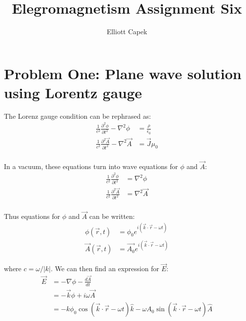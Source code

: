 \documentclass[10pt]{article} %
\title{Elegromagnetism Assignment Six}
\author{Elliott Capek}
\begin{document}
\maketitle{}

\section{Problem One: Plane wave solution using Lorentz gauge}
The Lorenz gauge condition can be rephrased as:\\

\begin{align*}
  \frac{1}{c^2}\frac{\partial^2\phi}{\partial t^2} - \nabla^2 \phi &= \frac{\rho}{\epsilon_0}\\
  \frac{1}{c^2}\frac{\partial^2\vec{A}}{\partial t^2} - \nabla^2 \vec{A} &= \vec{J}\mu_0\\
\end{align*}

In a vacuum, these equations turn into wave equations for $\phi$ and $\vec{A}$:\\

\begin{align*}
  \frac{1}{c^2}\frac{\partial^2\phi}{\partial t^2} &= \nabla^2 \phi\\
  \frac{1}{c^2}\frac{\partial^2\vec{A}}{\partial t^2} &= \nabla^2 \vec{A}\\
\end{align*}

Thus equations for $\phi$ and $\vec{A}$ can be written:\\

\begin{align*}
  \phi(\vec{r},t) &= \phi_0e^{i\left(\vec{k}\cdot\vec{r} -\omega t\right)}\\
  \vec{A}(\vec{r},t) &= \vec{A_0}e^{i\left(\vec{k}\cdot\vec{r} -\omega t\right)}
\end{align*}

where $c=\omega/|k|$. We can then find an expression for $\vec{E}$:\\

\begin{align*}
  \vec{E} &= -\nabla\phi - \frac{d\vec{A}}{dt}\\
  &= -\vec{k}\phi + i\omega\vec{A}\\
  &= -k\phi_0\cos(\vec{k}\cdot\vec{r} - \omega t)\hat{k} - \omega A_0\sin(\vec{k}\cdot\vec{r}-\omega t)\hat{A}\\
\end{align*}
\end{document}
